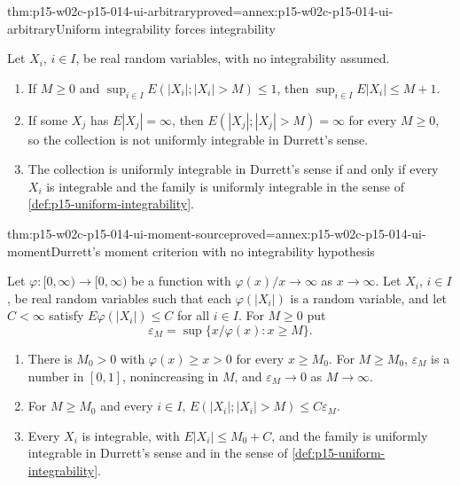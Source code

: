 \begin{hblemma}{thm:p15-w02c-p15-014-ui-arbitrary}{proved=annex:p15-w02c-p15-014-ui-arbitrary}{Uniform integrability forces integrability}
\par\nobreak
Let \(X_i\), \(i\in I\), be real random variables, with no integrability
assumed.
\begin{enumerate}
\item If \(M\geq0\) and \(\sup_{i\in I}E(|X_i|;|X_i|>M)\leq1\), then
      \(\sup_{i\in I}E|X_i|\leq M+1\).
\item If some \(X_j\) has \(E|X_j|=\infty\), then
      \(E(|X_j|;|X_j|>M)=\infty\) for every \(M\geq0\), so the collection
      is not uniformly integrable in Durrett's sense.
\item The collection is uniformly integrable in Durrett's sense if and
      only if every \(X_i\) is integrable and the family is uniformly
      integrable in the sense of \cref{def:p15-uniform-integrability}.
\end{enumerate}
\end{hblemma}

\begin{hblemma}{thm:p15-w02c-p15-014-ui-moment-source}{proved=annex:p15-w02c-p15-014-ui-moment}{Durrett's moment criterion with no integrability hypothesis}
\par\nobreak
Let \(\varphi:[0,\infty)\to[0,\infty)\) be a function with
\(\varphi(x)/x\to\infty\) as \(x\to\infty\). Let \(X_i\), \(i\in I\), be
real random variables such that each \(\varphi(|X_i|)\) is a random
variable, and let \(C<\infty\) satisfy \(E\varphi(|X_i|)\leq C\) for all
\(i\in I\). For \(M\geq0\) put
\[
 \varepsilon_M=\sup\{x/\varphi(x):x\geq M\}.
\]
\begin{enumerate}
\item There is \(M_0>0\) with \(\varphi(x)\geq x>0\) for every
      \(x\geq M_0\). For \(M\geq M_0\), \(\varepsilon_M\) is a number in
      \([0,1]\), nonincreasing in \(M\), and \(\varepsilon_M\to0\) as
      \(M\to\infty\).
\item For \(M\geq M_0\) and every \(i\in I\),
      \(E(|X_i|;|X_i|>M)\leq C\varepsilon_M\).
\item Every \(X_i\) is integrable, with \(E|X_i|\leq M_0+C\), and the
      family is uniformly integrable in Durrett's sense and in the sense
      of \cref{def:p15-uniform-integrability}.
\end{enumerate}
\end{hblemma}

